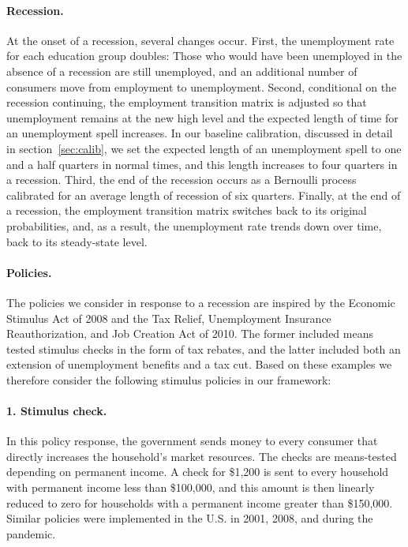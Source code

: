\documentclass[\econtexRoot/HAFiscal]{subfiles}
\begin{document}
\paragraph{Recession.} At the onset of a recession, several changes occur.
First, the unemployment rate for each education group doubles: Those who would have been unemployed in the absence of a recession are still unemployed, and an additional number of consumers move from employment to unemployment.
Second, conditional on the recession continuing, the employment transition matrix is adjusted so that unemployment remains at the new high level and the expected length of time for an unemployment spell increases.
In our baseline calibration, discussed in detail in section~\ref{sec:calib}, we set the expected length of an unemployment spell to one and a half quarters in normal times, and this length increases to four quarters in a recession.
Third, the end of the recession occurs as a Bernoulli process calibrated for an average length of recession of six quarters.
Finally, at the end of a recession, the employment transition matrix switches back to its original probabilities, and, as a result, the unemployment rate trends down over time, back to its steady-state level.

\paragraph{Policies.} The policies we consider in response to a recession are inspired by the Economic Stimulus Act of 2008 and the Tax Relief, Unemployment Insurance Reauthorization, and Job Creation Act of 2010.
The former included means tested stimulus checks in the form of tax rebates, and the latter included both an extension of unemployment benefits and a tax cut.
Based on these examples we therefore consider the following stimulus policies in our framework: 

\paragraph{1.
Stimulus check.} In this policy response, the government sends money to every consumer that directly increases the household's market resources.
The checks are means-tested depending on permanent income.
A check for \$1,200 is sent to every household with permanent income less than \$100,000, and this amount is then linearly reduced to zero for households with a permanent income greater than \$150,000.
Similar policies were implemented in the U.S.
in 2001, 2008, and during the pandemic.
\end{document}
